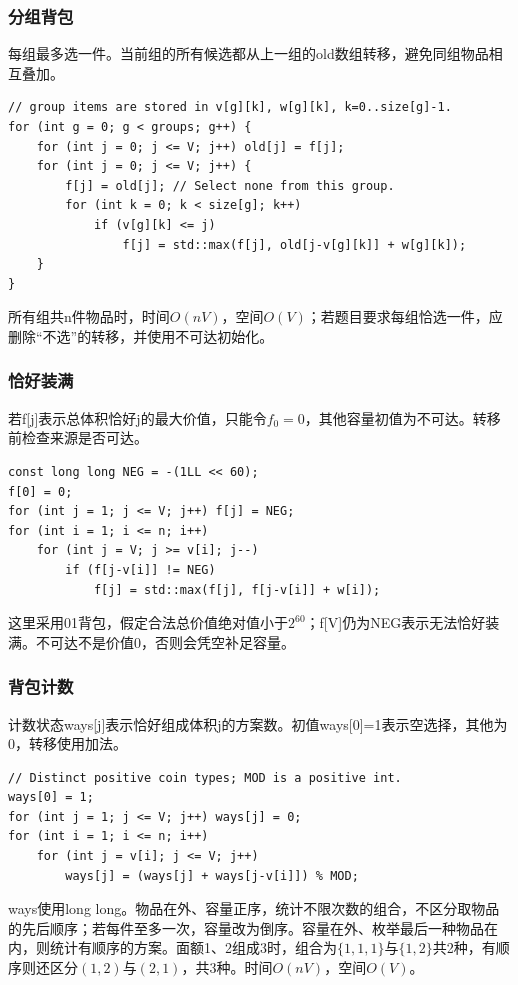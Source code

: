 \subsubsection{分组背包}
每组最多选一件。当前组的所有候选都从上一组的old数组转移，避免同组物品相互叠加。
\begin{lstlisting}
// group items are stored in v[g][k], w[g][k], k=0..size[g]-1.
for (int g = 0; g < groups; g++) {
    for (int j = 0; j <= V; j++) old[j] = f[j];
    for (int j = 0; j <= V; j++) {
        f[j] = old[j]; // Select none from this group.
        for (int k = 0; k < size[g]; k++)
            if (v[g][k] <= j)
                f[j] = std::max(f[j], old[j-v[g][k]] + w[g][k]);
    }
}
\end{lstlisting}
所有组共n件物品时，时间$O(nV)$，空间$O(V)$；若题目要求每组恰选一件，应删除“不选”的转移，并使用不可达初始化。
\subsubsection{恰好装满}
若f[j]表示总体积恰好j的最大价值，只能令$f_0=0$，其他容量初值为不可达。转移前检查来源是否可达。
\begin{lstlisting}
const long long NEG = -(1LL << 60);
f[0] = 0;
for (int j = 1; j <= V; j++) f[j] = NEG;
for (int i = 1; i <= n; i++)
    for (int j = V; j >= v[i]; j--)
        if (f[j-v[i]] != NEG)
            f[j] = std::max(f[j], f[j-v[i]] + w[i]);
\end{lstlisting}
这里采用01背包，假定合法总价值绝对值小于$2^{60}$；f[V]仍为NEG表示无法恰好装满。不可达不是价值0，否则会凭空补足容量。
\subsubsection{背包计数}
计数状态ways[j]表示恰好组成体积j的方案数。初值ways[0]=1表示空选择，其他为0，转移使用加法。
\begin{lstlisting}
// Distinct positive coin types; MOD is a positive int.
ways[0] = 1;
for (int j = 1; j <= V; j++) ways[j] = 0;
for (int i = 1; i <= n; i++)
    for (int j = v[i]; j <= V; j++)
        ways[j] = (ways[j] + ways[j-v[i]]) % MOD;
\end{lstlisting}
ways使用long long。物品在外、容量正序，统计不限次数的组合，不区分取物品的先后顺序；若每件至多一次，容量改为倒序。容量在外、枚举最后一种物品在内，则统计有顺序的方案。面额1、2组成3时，组合为$\{1,1,1\}$与$\{1,2\}$共2种，有顺序则还区分$(1,2)$与$(2,1)$，共3种。时间$O(nV)$，空间$O(V)$。
